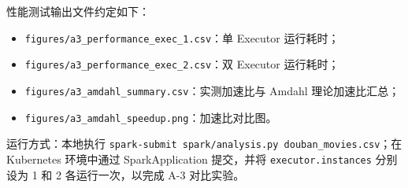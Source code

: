性能测试输出文件约定如下：

\begin{itemize}
  \item \verb|figures/a3_performance_exec_1.csv|：单 Executor 运行耗时；
  \item \verb|figures/a3_performance_exec_2.csv|：双 Executor 运行耗时；
  \item \verb|figures/a3_amdahl_summary.csv|：实测加速比与 Amdahl 理论加速比汇总；
  \item \verb|figures/a3_amdahl_speedup.png|：加速比对比图。
\end{itemize}

运行方式：本地执行 \verb|spark-submit spark/analysis.py douban_movies.csv|；在 Kubernetes 环境中通过 SparkApplication 提交，并将 \verb|executor.instances| 分别设为 1 和 2 各运行一次，以完成 A-3 对比实验。
